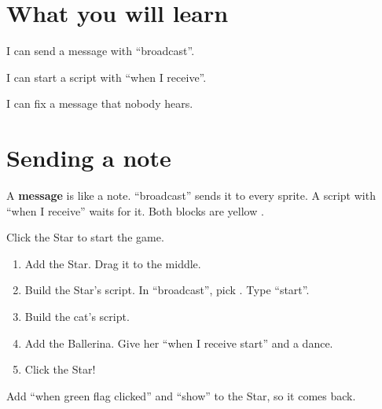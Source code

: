 
\section{What you will learn}
\begin{ican}
  \item I can send a message with \enquote{broadcast}.
  \item I can start a script with \enquote{when I receive}.
  \item I can fix a message that nobody hears.
\end{ican}

\section{Sending a note}
A \textbf{message} is like a note. \enquote{broadcast} sends it to every sprite. A script with \enquote{when I receive} waits for it. Both blocks are yellow .

\begin{exercise}
Click the Star to start the game.
\begin{enumerate}[leftmargin=1.4em,itemsep=2pt]
  \item Add the Star. Drag it to the middle.
  \item Build the Star's script. In \enquote{broadcast}, pick . Type \enquote{start}.
  \item Build the cat's script.
  \item Add the Ballerina. Give her \enquote{when I receive start} and a dance.
  \item Click the Star!
\end{enumerate}
\begin{center}
\begin{scratch}[scale=0.85]
\end{scratch}
\quad
\begin{scratch}[scale=0.85]
\end{scratch}
\end{center}
Add \enquote{when green flag clicked} and \enquote{show} to the Star, so it comes back.
\end{exercise}

